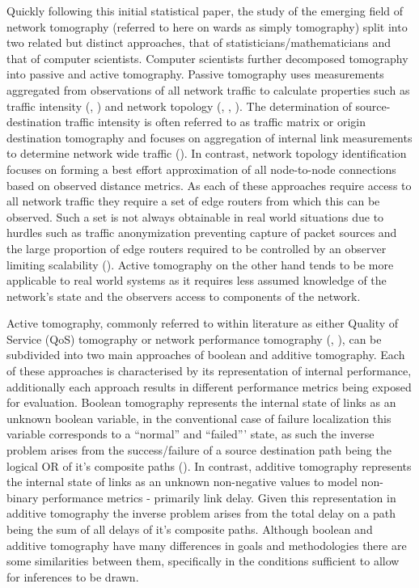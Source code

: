 Quickly following this initial statistical paper, the study of the emerging field of network tomography (referred to here on wards as simply tomography) split into two related but distinct approaches, that of statisticians/mathematicians and that of computer scientists. Computer scientists further decomposed tomography into passive and active tomography. Passive tomography uses measurements aggregated from observations of all network traffic to calculate properties such as traffic intensity (\cite{vardi_network_1996}, \cite{coates_network_2001}) and network topology (\cite{hailiang_network_2009}, \cite{zhang_topology_2014}, \cite{hailiang_network_2009}). The determination of source-destination traffic intensity is often referred to as traffic matrix or origin destination tomography and focuses on aggregation of internal link measurements to determine network wide traffic (\cite{cao_time-varying_2000}). In contrast, network topology identification focuses on forming a best effort approximation of all node-to-node connections based on observed distance metrics. As each of these approaches require access to all network traffic they require a set of edge routers from which this can be observed. Such a set is not always obtainable in real world situations due to hurdles such as traffic anonymization preventing capture of packet sources and the large proportion of edge routers required to be controlled by an observer limiting scalability (\cite{leung_measurement-based_2002}). Active tomography on the other hand tends to be more applicable to real world systems as it requires less assumed knowledge of the network's state and the observers access to components of the network.\par
Active tomography, commonly referred to within literature as either Quality of Service (QoS) tomography or network performance tomography (\cite{lawrence_network_2006}, \cite{barnes_stochastic_2020}), can be subdivided into two main approaches of boolean and additive tomography. Each of these approaches is characterised by its representation of internal performance, additionally each approach results in different performance metrics being exposed for evaluation. Boolean tomography represents the internal state of links as an unknown boolean variable, in the conventional case of failure localization this variable corresponds to a “normal” and “failed”' state, as such the inverse problem arises from the success/failure of a source destination path being the logical OR of it’s composite paths (\cite{duffield_network_2006}). In contrast, additive tomography represents the internal state of links as an unknown non-negative values to model non-binary performance metrics - primarily link delay. Given this representation in additive tomography the inverse problem arises from the total delay on a path being the sum of all delays of it’s composite paths. Although boolean and additive tomography have many differences in goals and methodologies there are some similarities between them, specifically in the conditions sufficient to allow for inferences to be drawn. \par
